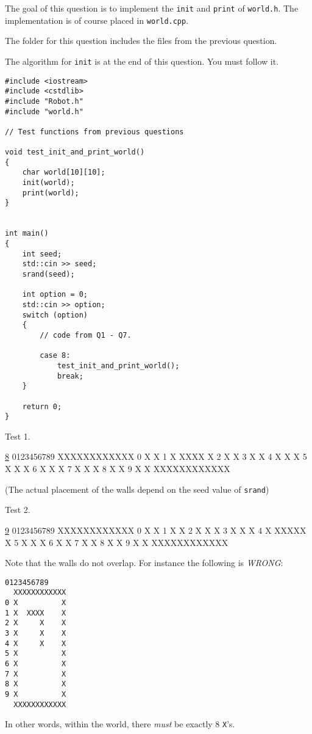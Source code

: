 The goal of this question is to implement the
\verb!init! and \verb!print!
of \verb!world.h!.
The implementation is of course placed in
\verb!world.cpp!.

The folder for this question
includes the files from the previous question.

The algorithm for \verb!init! is at the end of this question.
You must follow it.

{\small
\begin{Verbatim}[frame=single]
#include <iostream>
#include <cstdlib>
#include "Robot.h"
#include "world.h"

// Test functions from previous questions

void test_init_and_print_world()
{
    char world[10][10];
    init(world);
    print(world);
}


int main()
{
    int seed;
    std::cin >> seed;
    srand(seed);
    
    int option = 0;
    std::cin >> option;
    switch (option)
    {
        // code from Q1 - Q7.

        case 8:
            test_init_and_print_world();
            break;
    }
      
    return 0;
}
\end{Verbatim}
}

Test 1.
{\small
\begin{console}[commandchars=\\\{\}]
\underline{8}
   0123456789
  XXXXXXXXXXXX
0 X          X
1 X  XXXX    X
2 X          X
3 X          X
4 X      X   X
5 X      X   X
6 X      X   X
7 X      X   X
8 X          X
9 X          X
  XXXXXXXXXXXX
\end{console}
}
(The actual placement of the walls depend on the seed value of
\verb!srand!)

Test 2.
{\small
\begin{console}[commandchars=\\\{\}]
\underline{9}
  0123456789
  XXXXXXXXXXXX
0 X          X
1 X          X
2 X  X       X
3 X  X       X
4 X  XXXXX   X
5 X  X       X
6 X          X
7 X          X
8 X          X
9 X          X
  XXXXXXXXXXXX
\end{console}
}

Note that the walls do not overlap.
For instance the following is \textit{WRONG}:
\begin{Verbatim}[frame=single]
   0123456789
  XXXXXXXXXXXX
0 X          X
1 X  XXXX    X
2 X     X    X
3 X     X    X
4 X     X    X
5 X          X
6 X          X
7 X          X
8 X          X
9 X          X
  XXXXXXXXXXXX
\end{Verbatim}
In other words, within the world, there \textit{must} be exactly 8
\verb!X!'s.



